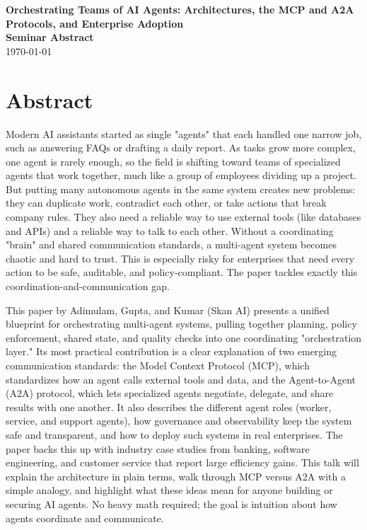 \documentclass[12pt]{article}
\newcommand{\seminardate}{\today}
\begin{document}
\begin{center}
  {\LARGE\bfseries Orchestrating Teams of AI Agents: Architectures, the MCP and A2A Protocols, and Enterprise Adoption}\\[8pt]
  {\large\bfseries Seminar Abstract}\\[6pt]
  {\normalsize \seminardate}
\end{center}
\vspace{1.5em}

\section*{Abstract}
Modern AI assistants started as single "agents" that each handled one narrow job, such as answering FAQs or drafting a daily report. As tasks grow more complex, one agent is rarely enough, so the field is shifting toward teams of specialized agents that work together, much like a group of employees dividing up a project. But putting many autonomous agents in the same system creates new problems: they can duplicate work, contradict each other, or take actions that break company rules. They also need a reliable way to use external tools (like databases and APIs) and a reliable way to talk to each other. Without a coordinating "brain" and shared communication standards, a multi-agent system becomes chaotic and hard to trust. This is especially risky for enterprises that need every action to be safe, auditable, and policy-compliant. The paper tackles exactly this coordination-and-communication gap.

This paper by Adimulam, Gupta, and Kumar (Skan AI) presents a unified blueprint for orchestrating multi-agent systems, pulling together planning, policy enforcement, shared state, and quality checks into one coordinating "orchestration layer." Its most practical contribution is a clear explanation of two emerging communication standards: the Model Context Protocol (MCP), which standardizes how an agent calls external tools and data, and the Agent-to-Agent (A2A) protocol, which lets specialized agents negotiate, delegate, and share results with one another. It also describes the different agent roles (worker, service, and support agents), how governance and observability keep the system safe and transparent, and how to deploy such systems in real enterprises. The paper backs this up with industry case studies from banking, software engineering, and customer service that report large efficiency gains. This talk will explain the architecture in plain terms, walk through MCP versus A2A with a simple analogy, and highlight what these ideas mean for anyone building or securing AI agents. No heavy math required; the goal is intuition about how agents coordinate and communicate.
\end{document}

